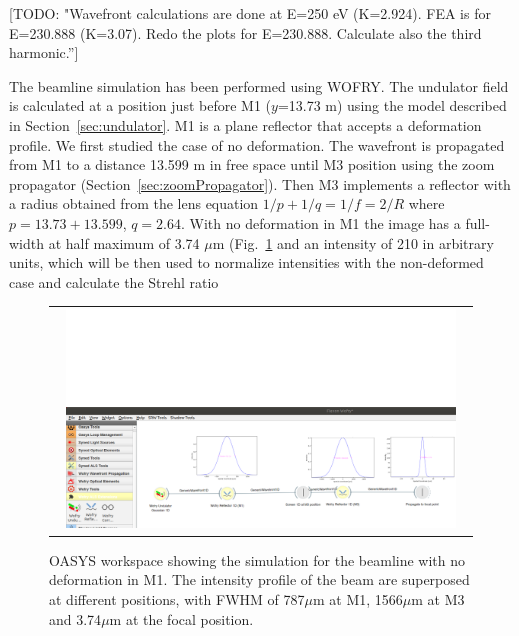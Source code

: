\documentclass[]{spie}  %
\newcommand{\todo}[1]{{\color{red}[TODO: "#1'']}}
\begin{document}
\todo{Wavefront calculations are done at E=250 eV (K=2.924). FEA is for E=230.888 (K=3.07). Redo the plots for E=230.888. Calculate also the third harmonic.} 

The beamline simulation has been performed using WOFRY. The undulator field is calculated at a position just before M1 ($y$=13.73 m) using the model described in Section~\ref{sec:undulator}. M1 is a plane reflector that accepts a deformation profile. We first studied the case of no deformation. The wavefront is propagated from M1 to a distance 13.599 m in free space until M3 position using the zoom propagator (Section~\ref{sec:zoomPropagator}). Then M3 implements a reflector with a radius obtained from the lens equation $1/p + 1/q=1/f=2/R$ where $p=13.73+13.599$, $q=2.64$. With no deformation in M1 the image has a full-width at half maximum of 3.74 $\mu$m (Fig.~\ref{fig:nodeformation} and an intensity of 210 in arbitrary units, which will be then used to normalize intensities with the non-deformed case and calculate the Strehl ratio



   \begin{figure} [ht]
   \begin{center}
   \begin{tabular}{c} 
   \includegraphics[trim=0 0 5 200,clip,width=0.95\textwidth]{figures/wofrynodeformation.png}

   \end{tabular}
   \end{center}
   \caption[example] 
   { \label{fig:nodeformation} 
OASYS workspace showing the simulation for the beamline with no deformation in M1. The intensity profile of the beam are superposed at different positions, with FWHM of 787$\mu$m at M1, 1566$\mu$m at M3 and 3.74$\mu$m at the focal position.  }
   \end{figure} 
\end{document}
